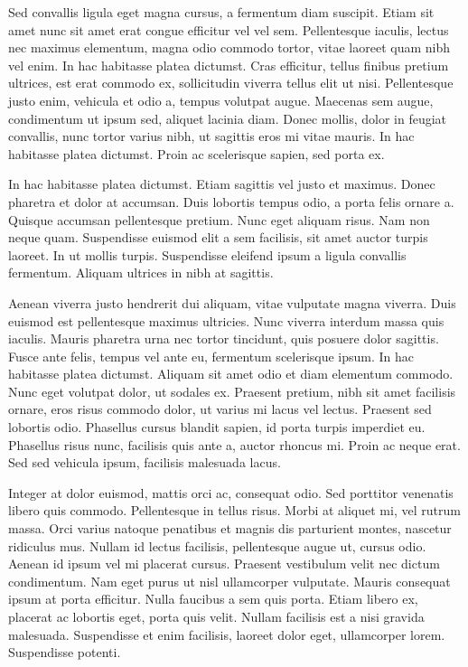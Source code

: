 \documentclass{book}
\begin{document}
            Sed convallis ligula eget magna cursus, a fermentum diam suscipit. Etiam sit amet
               nunc sit amet erat congue efficitur vel vel sem. Pellentesque iaculis, lectus nec
               maximus elementum, magna odio commodo tortor, vitae laoreet quam nibh vel enim. In
               hac habitasse platea dictumst. Cras efficitur, tellus finibus pretium ultrices, est
               erat commodo ex, sollicitudin viverra tellus elit ut nisi. Pellentesque justo enim,
               vehicula et odio a, tempus volutpat augue. Maecenas sem augue, condimentum ut ipsum
               sed, aliquet lacinia diam. Donec mollis, dolor in feugiat convallis, nunc tortor
               varius nibh, ut sagittis eros mi vitae mauris. In hac habitasse platea dictumst.
               Proin ac scelerisque sapien, sed porta ex.
            
            In hac habitasse platea dictumst. Etiam sagittis vel justo et maximus. Donec pharetra
               et dolor at accumsan. Duis lobortis tempus odio, a porta felis ornare a. Quisque
               accumsan pellentesque pretium. Nunc eget aliquam risus. Nam non neque quam.
               Suspendisse euismod elit a sem facilisis, sit amet auctor turpis laoreet. In ut
               mollis turpis. Suspendisse eleifend ipsum a ligula convallis fermentum. Aliquam
               ultrices in nibh at sagittis.
            
            Aenean viverra justo hendrerit dui aliquam, vitae vulputate magna viverra. Duis
               euismod est pellentesque maximus ultricies. Nunc viverra interdum massa quis iaculis.
               Mauris pharetra urna nec tortor tincidunt, quis posuere dolor sagittis. Fusce ante
               felis, tempus vel ante eu, fermentum scelerisque ipsum. In hac habitasse platea
               dictumst. Aliquam sit amet odio et diam elementum commodo. Nunc eget volutpat dolor,
               ut sodales ex. Praesent pretium, nibh sit amet facilisis ornare, eros risus commodo
               dolor, ut varius mi lacus vel lectus. Praesent sed lobortis odio. Phasellus cursus
               blandit sapien, id porta turpis imperdiet eu. Phasellus risus nunc, facilisis quis
               ante a, auctor rhoncus mi. Proin ac neque erat. Sed sed vehicula ipsum, facilisis
               malesuada lacus.
            
            Integer at dolor euismod, mattis orci ac, consequat odio. Sed porttitor venenatis
               libero quis commodo. Pellentesque in tellus risus. Morbi at aliquet mi, vel rutrum
               massa. Orci varius natoque penatibus et magnis dis parturient montes, nascetur
               ridiculus mus. Nullam id lectus facilisis, pellentesque augue ut, cursus odio. Aenean
               id ipsum vel mi placerat cursus. Praesent vestibulum velit nec dictum condimentum.
               Nam eget purus ut nisl ullamcorper vulputate. Mauris consequat ipsum at porta
               efficitur. Nulla faucibus a sem quis porta. Etiam libero ex, placerat ac lobortis
               eget, porta quis velit. Nullam facilisis est a nisi gravida malesuada. Suspendisse et
               enim facilisis, laoreet dolor eget, ullamcorper lorem. Suspendisse potenti.
            
\end{document}
